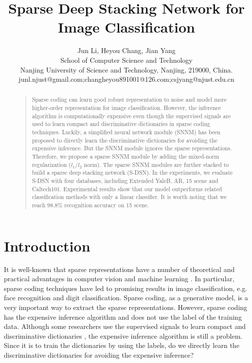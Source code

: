 \documentclass[letterpaper]{article}
\begin{document}
%
\title{Sparse Deep Stacking Network for Image Classification}
\author{Jun Li, Heyou Chang, Jian Yang\\
School of Computer Science and Technology \\
Nanjing University of Science and Technology, Nanjing, 219000, China.\\
junl.njust@gmail.com;changheyou891001@126.com;csjyang@njust.edu.cn\\
}
\maketitle
\begin{abstract}
\begin{quote}
Sparse coding can learn good robust representation to noise and model more higher-order representation for image classification. However, the inference algorithm is computationally expensive even though the supervised signals are used to learn compact and discriminative dictionaries in sparse coding techniques. Luckily, a simplified neural network module (SNNM) has been proposed to directly learn the discriminative dictionaries for avoiding the expensive inference. But the SNNM module ignores the sparse representations. Therefore, we propose a sparse SNNM module by adding the mixed-norm regularization ($l_1/l_2$ norm). The sparse SNNM modules are further stacked to build a sparse deep stacking network (S-DSN). In the experiments, we evaluate S-DSN with four databases, including Extended YaleB, AR, 15 scene and Caltech101. Experimental results show that our model outperforms related classification methods with only a linear classifier. It is worth noting that we reach $98.8\%$ recognition accuracy on 15 scene.
\end{quote}
\end{abstract}

\section{Introduction}
It is well-known that sparse representations have a number of theoretical and practical advantages in computer vision and machine learning \cite{Lee2007,Gregor2010,Yang2012}. In particular, sparse coding techniques have led to promising results in image classification, e.g. face recognition and digit classification. Sparse coding, as a generative model, is a very important way to extract the sparse representations. However, sparse coding has the expensive inference algorithm and does not use the label of the training data. Although some researchers use the supervised signals to learn compact and discriminative dictionaries \cite{Jiang2013,Zhuang2013,Huang2013}, the expensive inference algorithm is still a problem. Since it is to train the dictionaries by using the labels, do we directly learn the discriminative dictionaries for avoiding the expensive inference?
\end{document}

